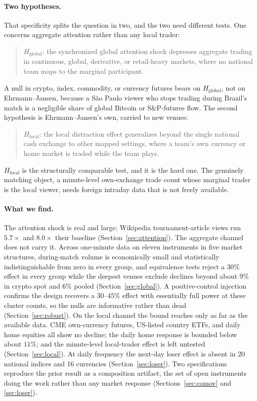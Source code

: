 \documentclass[12pt]{article}
\begin{document}
\paragraph{Two hypotheses.} That specificity splits the question in two, and the two need different tests. One concerns aggregate attention rather than any local trader:
\begin{quote}
$H_{\text{global}}$: the synchronized global attention shock depresses aggregate trading in continuous, global, derivative, or retail-heavy markets, where no national team maps to the marginal participant.
\end{quote}
A null in crypto, index, commodity, or currency futures bears on $H_{\text{global}}$, not on Ehrmann--Jansen, because a S\~ao Paulo viewer who stops trading during Brazil's match is a negligible share of global Bitcoin or S\&P-futures flow. The second hypothesis is Ehrmann--Jansen's own, carried to new venues:
\begin{quote}
$H_{\text{local}}$: the local distraction effect generalizes beyond the single national cash exchange to other mapped settings, where a team's own currency or home market is traded while the team plays.
\end{quote}
$H_{\text{local}}$ is the structurally comparable test, and it is the hard one. The genuinely matching object, a minute-level own-exchange trade count whose marginal trader is the local viewer, needs foreign intraday data that is not freely available.

\paragraph{What we find.} The attention shock is real and large; Wikipedia tournament-article views run $5.7\times$ and $8.0\times$ their baseline (Section~\ref{sec:attention}). The aggregate channel does not carry it. Across one-minute data on eleven instruments in five market structures, during-match volume is economically small and statistically indistinguishable from zero in every group, and equivalence tests reject a $30\%$ effect in every group while the deepest venues exclude declines beyond about $9\%$ in crypto spot and $6\%$ pooled (Section~\ref{sec:global}). A positive-control injection confirms the design recovers a $30$--$45\%$ effect with essentially full power at these cluster counts, so the nulls are informative rather than dead (Section~\ref{sec:robust}). On the local channel the bound reaches only as far as the available data. CME own-currency futures, US-listed country ETFs, and daily home equities all show no decline; the daily home response is bounded below about $11\%$; and the minute-level local-trader effect is left untested (Section~\ref{sec:local}). At daily frequency the next-day loser effect is absent in 20 national indices and 16 currencies (Section~\ref{sec:loser}). Two specifications reproduce the prior result as a composition artifact, the set of open instruments doing the work rather than any market response (Sections~\ref{sec:comov} and \ref{sec:loser}).
\end{document}
